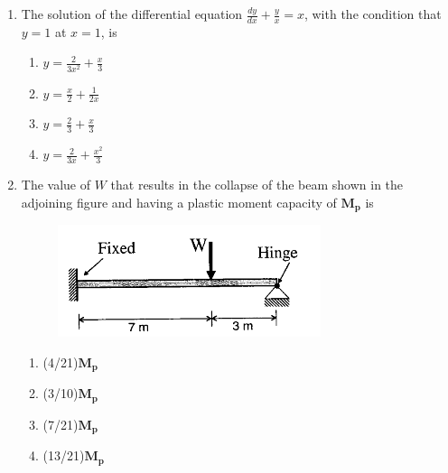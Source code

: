 \documentclass[journal,12pt,onecolumn]{IEEEtran}
\theoremstyle{remark}
\begin{document}
\begin{enumerate}
\item The solution of the differential equation $\frac{dy}{dx}+\frac{y}{x}=x$, with the condition that $y=1$ at $x=1$, is
	\begin{multicols}{4}
	\begin{enumerate}
		\item $y=\frac{2}{3x^{2}}+\frac{x}{3}$
		\item $y=\frac{x}{2}+\frac{1}{2x}$
 		\item $y=\frac{2}{3}+\frac{x}{3}$
		\item $y=\frac{2}{3x}+\frac{x^{2}}{3}$
	\end{enumerate}
	\end{multicols}

\item The value of $W$ that results in the collapse of the beam shown in the adjoining figure and having a plastic moment capacity of $\mathbf{M_{p}}$ is
\begin{figure}[ht]
\centering
\includegraphics[scale=0.4]{figs/fig1.png}
\end{figure}
	\begin{multicols}{4}
	\begin{enumerate}
		\item (4/21)$\mathbf{M_{p}}$
		\item (3/10)$\mathbf{M_{p}}$
		\item (7/21)$\mathbf{M_{p}}$
		\item (13/21)$\mathbf{M_{p}}$
	\end{enumerate}
	\end{multicols}


\end{enumerate}
\end{document}
